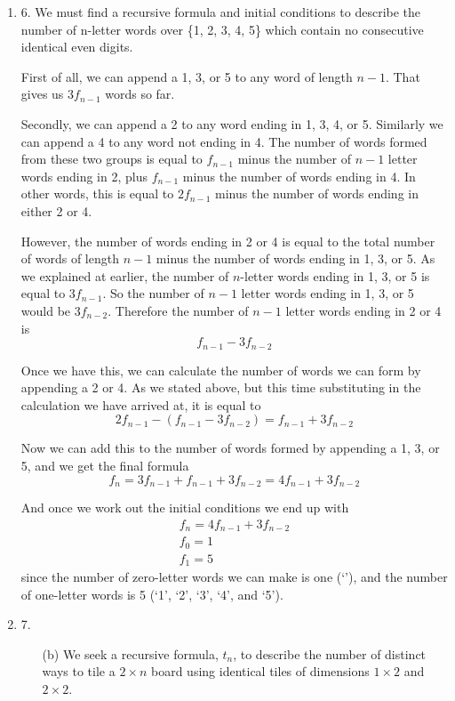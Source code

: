 \documentclass[fleqn]{article}
\newenvironment{answers}{ %
	\begin{enumerate}
		\setlength{\itemsep}{\bigskipamount}
}{\end{enumerate}}
\begin{document}
\begin{answers}
	\item[6.]
	We must find a recursive formula and initial conditions to describe the number of n-letter words over \{1, 2, 3, 4, 5\} which contain no consecutive identical even digits.

	First of all, we can append a 1, 3, or 5 to any word of length \(n-1\). That gives us \(3f_{n-1}\) words so far.

	Secondly, we can append a 2 to any word ending in 1, 3, 4, or 5. Similarly we can append a 4 to any word not ending in 4. The number of words formed from these two groups is equal to \(f_{n-1}\) minus the number of \(n-1\) letter words ending in 2, plus \(f_{n-1}\) minus the number of words ending in 4. In other words, this is equal to \(2f_{n-1}\) minus the number of words ending in either 2 or 4.

	However, the number of words ending in 2 or 4 is equal to the total number of words of length \(n-1\) minus the number of words ending in 1, 3, or 5. As we explained at earlier, the number of \(n\)-letter words ending in 1, 3, or 5 is equal to \(3f_{n-1}\). So the number of \(n-1\) letter words ending in 1, 3, or 5 would be \(3f_{n-2}\). Therefore the number of \(n-1\) letter words ending in 2 or 4 is
	\[f_{n-1} - 3f_{n-2}\]

	Once we have this, we can calculate the number of words we can form by appending a 2 or 4. As we stated above, but this time substituting in the calculation we have arrived at, it is equal to
	\[2f_{n-1}-(f_{n-1} - 3f_{n-2}) = f_{n-1}+3f_{n-2}\]

	Now we can add this to the number of words formed by appending a 1, 3, or 5, and we get the final formula
	\[f_{n} = 3f_{n-1} + f_{n-1}+3f_{n-2} = 4f_{n-1}+3f_{n-2}\]

	And once we work out the initial conditions we end up with
	\begin{gather*}
		f_{n} = 4f_{n-1}+3f_{n-2} \\
		f_0 = 1 \\
		f_1 = 5
	\end{gather*}
	since the number of zero-letter words we can make is one (`'), and the number of one-letter words is 5 (`1', `2', `3', `4', and `5').

	\item[7.]
	\begin{enumerate}
		\item[(b)]
		We seek a recursive formula, \(t_n\), to describe the number of distinct ways to tile a \(2 \times n\) board using identical tiles of dimensions \(1 \times 2\) and \(2 \times 2\).


\end{enumerate}
\end{answers}
\end{document}
